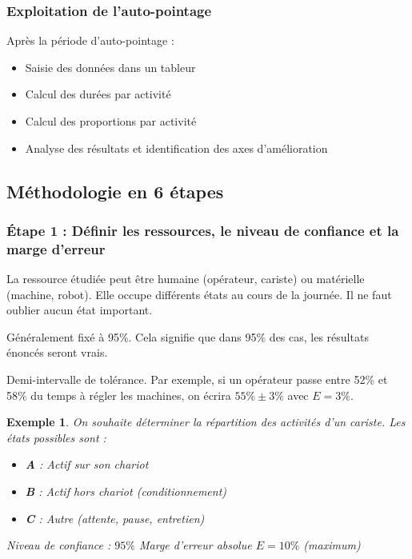 \documentclass[a4paper,12pt]{article}
\newtheorem{exemple}{Exemple}[section]
\begin{document}
\subsubsection{Exploitation de l'auto-pointage}

Après la période d'auto-pointage :
\begin{itemize}
    \item Saisie des données dans un tableur
    \item Calcul des durées par activité
    \item Calcul des proportions par activité
    \item Analyse des résultats et identification des axes d'amélioration
\end{itemize}

\subsection{Méthodologie en 6 étapes}

\subsubsection{Étape 1 : Définir les ressources, le niveau de confiance et la marge d'erreur}

\begin{description}[labelwidth=4cm]
    \item[Ressource] La ressource étudiée peut être humaine (opérateur, cariste) ou matérielle (machine, robot). Elle occupe différents états au cours de la journée. Il ne faut oublier aucun état important.
    
    \item[Niveau de confiance] Généralement fixé à 95\%. Cela signifie que dans 95\% des cas, les résultats énoncés seront vrais.
    
    \item[Marge d'erreur absolue E] Demi-intervalle de tolérance. Par exemple, si un opérateur passe entre 52\% et 58\% du temps à régler les machines, on écrira $55\% \pm 3\%$ avec $E = 3\%$.
\end{description}

\begin{exemple}
On souhaite déterminer la répartition des activités d'un cariste. Les états possibles sont :
\begin{itemize}
    \item \textbf{A} : Actif sur son chariot
    \item \textbf{B} : Actif hors chariot (conditionnement)
    \item \textbf{C} : Autre (attente, pause, entretien)
\end{itemize}
Niveau de confiance : $95\%$
Marge d'erreur absolue $E = 10\%$ (maximum)
\end{exemple}
\end{document}
